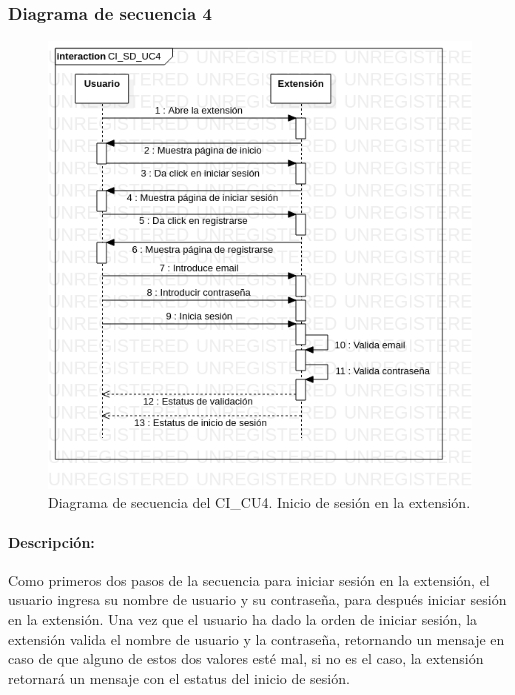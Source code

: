 \documentclass[12pt, a4paper, titlepage]{report}
\begin{document}
    			\subsubsection{Diagrama de secuencia 4}
    			    \begin{figure}[H]
    				    \begin{center} \includegraphics[width=15cm]{./imagenes/Disenio/Componente_1/CI_SD_UC4.png}
    				    \caption[Diagrama de secuencia 4 del Componente I]{Diagrama de secuencia del CI\_CU4. Inicio de sesión en la extensión.}
    			        \end{center}
    			    \end{figure}
    			    
    			    \paragraph{Descripción:}
        		    Como primeros dos pasos de la secuencia para iniciar sesión en la extensión, el usuario ingresa su nombre de usuario y su contraseña, para después iniciar sesión en la extensión. Una vez que el usuario ha dado la orden de iniciar sesión, la extensión valida el nombre de usuario y la contraseña, retornando un mensaje en caso de que alguno de estos dos valores esté mal, si no es el caso, la extensión retornará un mensaje con el estatus del inicio de sesión. 
    			
\end{document}
